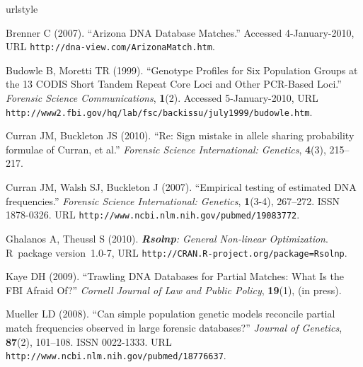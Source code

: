\documentclass[a4paper,11pt]{article}
\newcommand{\proglang}[1]{\textsf{#1}}
\newcommand{\pkg}[1]{\textbf{#1}}
\begin{document}
\begin{thebibliography}{}
\newcommand{\enquote}[1]{``#1''}
\providecommand{\natexlab}[1]{#1}
\providecommand{\url}[1]{\texttt{#1}}
\providecommand{\urlprefix}{URL }
\expandafter\ifx\csname urlstyle\endcsname\relax
  \providecommand{\doi}[1]{doi:\discretionary{}{}{}#1}\else
  \providecommand{\doi}{doi:\discretionary{}{}{}\begingroup
  \urlstyle{rm}\Url}\fi
\providecommand{\eprint}[2][]{\url{#2}}

Brenner C (2007).
\newblock \enquote{Arizona {DNA} Database Matches.}
\newblock Accessed 4-January-2010,
  \urlprefix\url{http://dna-view.com/ArizonaMatch.htm}.

Budowle B, Moretti TR (1999).
\newblock \enquote{Genotype Profiles for Six Population Groups at the 13
  {CODIS} Short Tandem Repeat Core Loci and Other {PCR}-Based Loci.}
\newblock \emph{Forensic Science Communications}, \textbf{1}(2).
\newblock Accessed 5-January-2010,
  \urlprefix\url{http://www2.fbi.gov/hq/lab/fsc/backissu/july1999/budowle.htm}.

Curran JM, Buckleton JS (2010).
\newblock \enquote{Re: Sign mistake in allele sharing probability formulae of
  {C}urran, et al.}
\newblock \emph{Forensic Science International: Genetics}, \textbf{4}(3),
  215--217.

Curran JM, Walsh SJ, Buckleton J (2007).
\newblock \enquote{Empirical testing of estimated {DNA} frequencies.}
\newblock \emph{Forensic Science International: Genetics}, \textbf{1}(3-4),
  267--272.
\newblock ISSN 1878-0326.
\newblock \urlprefix\url{http://www.ncbi.nlm.nih.gov/pubmed/19083772}.

Ghalanos A, Theussl S (2010).
\newblock \emph{\pkg{Rsolnp}: General Non-linear Optimization}.
\newblock \proglang{R}~package version~1.0-7,
  \urlprefix\url{http://CRAN.R-project.org/package=Rsolnp}.

Kaye DH (2009).
\newblock \enquote{Trawling {DNA} Databases for Partial Matches: What Is the
  {FBI} Afraid Of?}
\newblock \emph{Cornell Journal of Law and Public Policy}, \textbf{19}(1), (in
  press).

Mueller LD (2008).
\newblock \enquote{Can simple population genetic models reconcile partial match
  frequencies observed in large forensic databases?}
\newblock \emph{Journal of Genetics}, \textbf{87}(2), 101--108.
\newblock ISSN 0022-1333.
\newblock \urlprefix\url{http://www.ncbi.nlm.nih.gov/pubmed/18776637}.


\end{thebibliography}
\end{document}

